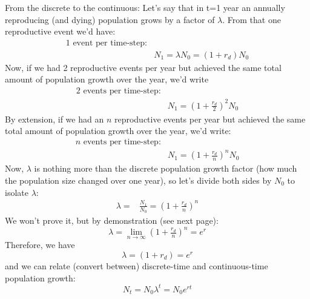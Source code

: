 \documentclass{article}
\newcommand*\circled[1]{\tikz[baseline=(char.base)]{
            \node[shape=circle,draw,inner sep=2pt] (char) {#1};}}
\begin{document}
\circled{2}
From the discrete to the continuous:
Let's say that in t=1 year an annually reproducing (and dying) population grows by a factor of $\lambda$.  From that one reproductive event we'd have:
\begin{align*}
\text{1 event per time-step:}&\\
	& N_1 = \lambda N_0=(1+r_d)N_0
\end{align*}
Now, if we had 2 reproductive events per year but achieved the same total amount of population growth over the year, we'd write
\begin{align*}
\text{2 events per time-step:}&\\
	& N_1 = \left(1+\tfrac{r_d}{2}\right)^2 N_0
\end{align*}
By extension, if we had an $n$  reproductive events per year but achieved the same total amount of population growth over the year, we'd write:
\begin{align*}
n \text{ events per time-step:}&\\
	& N_1 = \left(1+\tfrac{r_d}{n}\right)^n N_0
\end{align*}
Now, $\lambda$ is nothing more than the discrete population growth factor (how much the population size changed over one year), so let's divide both sides by $N_0$ to isolate $\lambda$:
\begin{align*}
	 \lambda  = & \frac{N_1}{N_0}=\left(1+\tfrac{r_d}{n}\right)^n
\end{align*}
We won't prove it, but by demonstration (see next page):
\begin{equation*}
	\lambda = \lim_{n \to \infty}\left(1+\tfrac{r_d}{n}\right)^n = e^r
\end{equation*}
Therefore, we have
\begin{equation*}
	\boxed{\lambda = (1+r_d) = e^r}
\end{equation*}
and we can relate (convert between) discrete-time and continuous-time population growth:
\begin{equation*}
	\boxed{N_t=N_0 \lambda^t=  N_0 e^{rt}}
\end{equation*}
\end{document}
